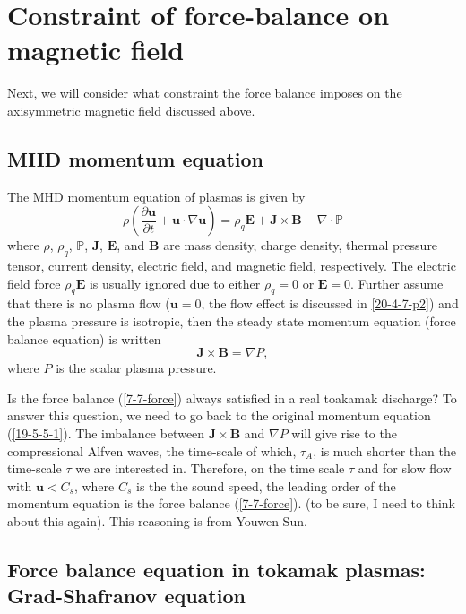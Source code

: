 \documentclass{llncs}
\begin{document}
\section{Constraint of force-balance on magnetic field}

Next, we will consider what constraint the force balance imposes on the
axisymmetric magnetic field discussed above.

\subsection{MHD momentum equation}

The MHD momentum equation of plasmas is given by
\begin{equation}
  \label{19-5-5-1} \rho \left( \frac{\partial \mathbf{u}}{\partial t}
  +\mathbf{u} \cdot \nabla \mathbf{u} \right) = \rho_q \mathbf{E}+\mathbf{J}
  \times \mathbf{B}- \nabla \cdot \mathbb{P}
\end{equation}
where $\rho$, $\rho_q$, $\mathbb{P}$, $\mathbf{J}$, $\mathbf{E}$, and
$\mathbf{B}$ are mass density, charge density, thermal pressure tensor,
current density, electric field, and magnetic field, respectively. The
electric field force $\rho_q \mathbf{E}$ is usually ignored due to either
$\rho_q = 0$ or $\mathbf{E}= 0$. Further assume that there is no plasma flow
($\mathbf{u}= 0$, the flow effect is discussed in \ref{20-4-7-p2}) and the
plasma pressure is isotropic, then the steady state momentum equation (force
balance equation) is written
\begin{equation}
  \label{7-7-force} \mathbf{J} \times \mathbf{B}= \nabla P,
\end{equation}
where $P$ is the scalar plasma pressure.

Is the force balance (\ref{7-7-force}) always satisfied in a real toakamak
discharge? To answer this question, we need to go back to the original
momentum equation (\ref{19-5-5-1}). The imbalance between $\mathbf{J} \times
\mathbf{B}$ and $\nabla P$ will give rise to the compressional Alfven waves,
the time-scale of which, $\tau_A$, is much shorter than the time-scale $\tau$
we are interested in. Therefore, on the time scale $\tau$ and for slow flow
with $\mathbf{u}< C_s$, where $C_s$ is the the sound speed, the leading order
of the momentum equation is the force balance (\ref{7-7-force}). (to be sure,
I need to think about this again). This reasoning is from Youwen
Sun{\cite{ysun2012}}.

\subsection{Force balance equation in tokamak plasmas: Grad-Shafranov
equation}\label{3-14-p1}
\end{document}
